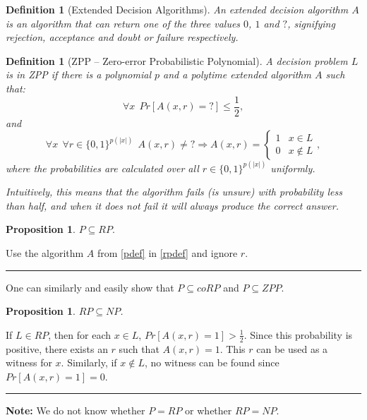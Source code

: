 \documentclass[a4paper,10pt]{article}
\newtheorem{proposition}[theorem]{Proposition}
\newtheorem{definition}[theorem]{Definition}
\newenvironment{proof}{{\bf Proof:}}{\hfill\rule{2mm}{2mm}}
\begin{document}
\begin{definition}[Extended Decision Algorithms]
An extended decision algorithm $A$ is an algorithm that can return one of the three values $0$, $1$ and $?$, signifying rejection, acceptance and doubt or failure respectively.
\end{definition}

\begin{definition}[ZPP -- Zero-error Probabilistic Polynomial]\label{zppdef}
A decision problem $L$ is in ZPP if there is a polynomial $p$ and a polytime extended algorithm $A$ such that:
$$\forall x ~~ Pr[A(x, r) = ?] \leq \frac{1}{2},$$ and
$$\forall x ~~ \forall r \in \{0, 1\}^{p(\vert x \vert)}  ~~ A(x, r)\neq ? \Rightarrow A(x, r) = \left\{\begin{matrix}
1 & x \in L\\ 
0 & x \not \in L
\end{matrix}\right.,$$
where the probabilities are calculated over all $r \in \{0, 1\}^{p(\vert x \vert)}$ uniformly.

Intuitively, this means that the algorithm fails (is unsure) with probability less than half, and when it does not fail it will always produce the correct answer.
\end{definition}

\begin{proposition}
$P \subseteq RP.$
\end{proposition}
\begin{proof}
Use the algorithm $A$ from \ref{pdef} in \ref{rpdef} and ignore $r$. 
\end{proof}

One can similarly and easily show that $P \subseteq coRP$ and $P \subseteq ZPP$.

\begin{proposition}
$RP \subseteq NP$.
\end{proposition}
\begin{proof}
If $L \in RP$, then for each $x \in L$, $Pr[A(x, r) = 1] > \frac{1}{2}$. Since this probability is positive, there exists an $r$ such that $A(x, r) = 1$. This $r$ can be used as a witness for $x$. Similarly, if $x \not \in L$, no witness can be found since $Pr[A(x, r) = 1] = 0$.
\end{proof}

\textbf{Note:} We do not know whether $P=RP$ or whether $RP=NP$. 
\end{document}
